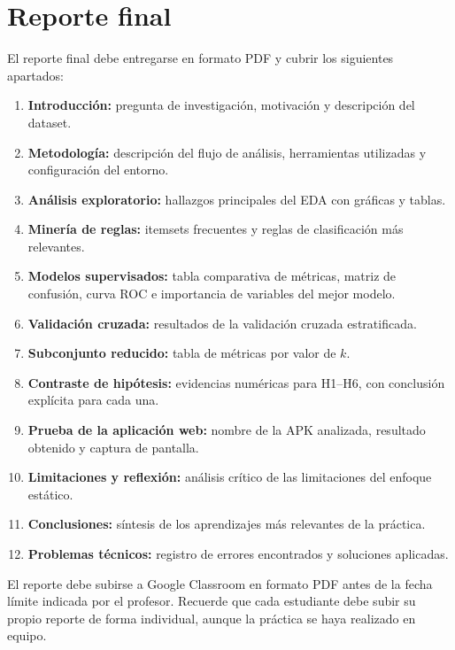 \documentclass[
  coursetitle={Cómputo Nube y Tecnologías Emergentes},
  coursehours={96},
  coursedate={Verano 2026},
  doctype={Taller},
  otherlangs={english,french},
  authorname={Lázaro},
  authorsurname={Bustio-Martínez},
  authortitle={PhD},
  role={Profesor Investigador},
  email={lbustio@inaoe.mx},
  phone={5559504000},
  ext={7459},
  institution={Instituto Nacional de Astrofísica, Óptica y Electrónica (INAOE)},
  department={Maestría en Ciencias en Tecnologías de Seguridad},
  address={Luis Enrique Erro 1, Sta. Ma. Tonantzintla, San Andrés Cholula, CP 72840, Puebla, México},
  margin={0.5in}
]{../../lbustio_lecture_notes}
\begin{document}
\section{Reporte final}

El reporte final debe entregarse en formato PDF y cubrir los siguientes apartados:

\begin{enumerate}
    \item \textbf{Introducción:} pregunta de investigación, motivación y descripción del dataset.
    \item \textbf{Metodología:} descripción del flujo de análisis, herramientas utilizadas y configuración del entorno.
    \item \textbf{Análisis exploratorio:} hallazgos principales del EDA con gráficas y tablas.
    \item \textbf{Minería de reglas:} itemsets frecuentes y reglas de clasificación más relevantes.
    \item \textbf{Modelos supervisados:} tabla comparativa de métricas, matriz de confusión, curva ROC e importancia de variables del mejor modelo.
    \item \textbf{Validación cruzada:} resultados de la validación cruzada estratificada.
    \item \textbf{Subconjunto reducido:} tabla de métricas por valor de $k$.
    \item \textbf{Contraste de hipótesis:} evidencias numéricas para H1--H6, con conclusión explícita para cada una.
    \item \textbf{Prueba de la aplicación web:} nombre de la APK analizada, resultado obtenido y captura de pantalla.
    \item \textbf{Limitaciones y reflexión:} análisis crítico de las limitaciones del enfoque estático.
    \item \textbf{Conclusiones:} síntesis de los aprendizajes más relevantes de la práctica.
    \item \textbf{Problemas técnicos:} registro de errores encontrados y soluciones aplicadas.
\end{enumerate}

\begin{tcolorbox}[title=Entrega]
El reporte debe subirse a Google Classroom en formato PDF antes de la fecha límite indicada por el profesor. Recuerde que cada estudiante debe subir su propio reporte de forma individual, aunque la práctica se haya realizado en equipo.
\end{tcolorbox}
\end{document}
